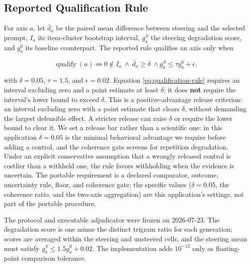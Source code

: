 \documentclass[manuscript,review,anonymous]{acmart}
\begin{document}
\subsection{Reported Qualification Rule}\label{reported-qualification-rule}

For axis \(a\), let \(\bar d_a\) be the paired mean difference between steering and the selected prompt, \(I_a\) its item-cluster bootstrap interval, \(g_a^S\) the steering degradation score, and \(g_a^0\) its baseline counterpart. The reported rule qualifies an axis only when

\begin{equation}
\operatorname{qualify}(a)\iff
0 \notin I_a\ \land\ \bar d_a\ge\delta\ \land
g_a^S\le\tau g_a^0+\epsilon.
\label{eq:qualification-rule}
\end{equation}

with \(\delta=0.05\), \(\tau=1.5\), and \(\epsilon=0.02\). {}%
{}%
{}%
Equation \ref{eq:qualification-rule} requires an interval excluding zero and a point estimate at least \(\delta\); it does \textbf{not} require the interval's lower bound to exceed \(\delta\). This is a positive-advantage release criterion: an interval excluding zero with a point estimate that clears \(\delta\), without demanding the largest defensible effect. A stricter release can raise \(\delta\) or require the lower bound to clear it. We set a release bar rather than a scientific one: in this application \(\delta=0.05\) is the minimal behavioral advantage we require before adding a control, and the coherence gate screens for repetition degradation. Under an explicit conservative assumption that a wrongly released control is costlier than a withheld one, the rule favors withholding when the evidence is uncertain. The portable requirement is a declared comparator, outcome, uncertainty rule, floor, and coherence gate; the specific values (\(\delta=0.05\), the coherence ratio, and the two-axis aggregation) are this application's settings, not part of the portable procedure.

The protocol and executable adjudicator were frozen on 2026-07-23. The degradation score is one minus the distinct trigram ratio for each generation; scores are averaged within the steering and unsteered cells, and the steering mean must satisfy \(g_a^S\le1.5g_a^0+0.02\). The implementation adds \(10^{-12}\) only as floating-point comparison tolerance.
\end{document}
